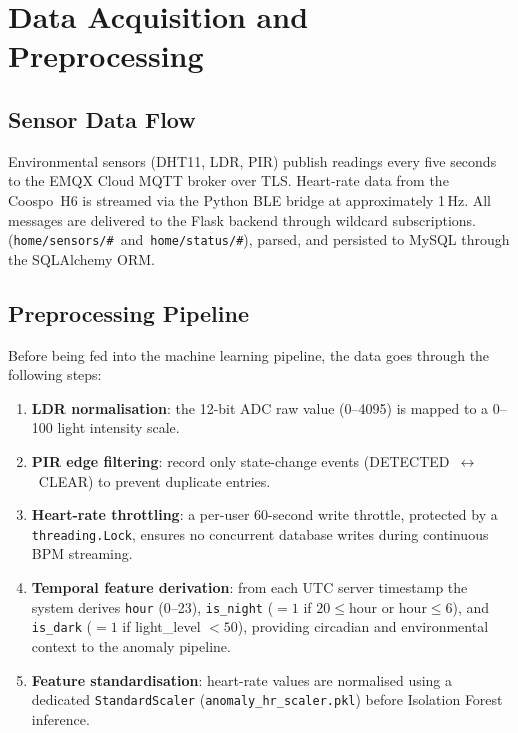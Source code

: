 \section{Data Acquisition and Preprocessing}
\label{sec:data_method}

\subsection{Sensor Data Flow}

Environmental sensors (DHT11, LDR, PIR) publish readings every five seconds to the EMQX Cloud MQTT broker over TLS. Heart-rate data from the Coospo~H6 is streamed via the Python BLE bridge at approximately 1\,Hz. All messages are delivered to the Flask backend through wildcard subscriptions.
(\texttt{home/sensors/\#}~and~\texttt{home/status/\#}), parsed, and persisted
to MySQL through the SQLAlchemy ORM.

\subsection{Preprocessing Pipeline}

Before being fed into the machine learning pipeline, the data goes through the following steps:
    \begin{enumerate}
    \item \textbf{LDR normalisation}: the 12-bit ADC raw value (0--4095) is mapped to a 0--100 light intensity scale.
    \item \textbf{PIR edge filtering}: record only state-change events (DETECTED~$\leftrightarrow$~CLEAR) to prevent duplicate entries.
    \item \textbf{Heart-rate throttling}: a per-user 60-second write throttle, protected by a \texttt{threading.Lock}, ensures no concurrent database writes during continuous BPM streaming.
    \item \textbf{Temporal feature derivation}: from each UTC server
    timestamp the system derives \texttt{hour} (0--23), \texttt{is\_night}
    ($= 1$ if $20 \leq \text{hour}$ or $\text{hour} \leq 6$), and
    \texttt{is\_dark} ($= 1$ if light\_level $< 50$), providing circadian
    and environmental context to the anomaly pipeline.
    \item \textbf{Feature standardisation}: heart-rate values are normalised
    using a dedicated \texttt{StandardScaler}
    (\texttt{anomaly\_hr\_scaler.pkl}) before Isolation Forest inference.
\end{enumerate}

